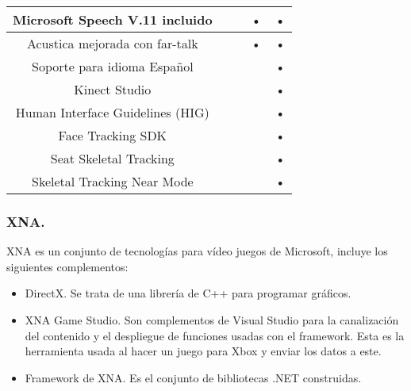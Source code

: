 \documentclass[11pt,a4paper]{article}
\begin{document}
\begin{tabular}{||c||c||c||c||c||}
\hline Microsoft Speech V.11 incluido           &        &        & •         & •           \\  
\hline Acustica mejorada con far-talk           &        &        & •         & •           \\  
\hline Soporte para idioma Español              &        &        &           & •           \\ 
\hline Kinect Studio                            &        &        &           & •           \\ 
\hline Human Interface Guidelines (HIG)         &        &        &           & •           \\ 
\hline Face Tracking SDK                        &        &        &           & •           \\ 
\hline Seat Skeletal Tracking                   &        &        &           & •           \\ 
\hline Skeletal Tracking Near Mode              &        &        &           & •           \\ 
\hline 
\end{tabular} 

\subsubsection{XNA.}
XNA es un conjunto de tecnologías para vídeo juegos de Microsoft, incluye los siguientes complementos: 
\begin{itemize}
\item DirectX. Se trata de una librería de C++ para programar gráficos.
\item XNA Game Studio. Son complementos de Visual Studio para la canalización del contenido y el despliegue de funciones usadas con el framework. Esta es la herramienta usada al hacer un juego para Xbox y enviar los datos a este.
\item Framework de XNA. Es el conjunto de bibliotecas .NET construidas.
\end{itemize}
\end{document}

